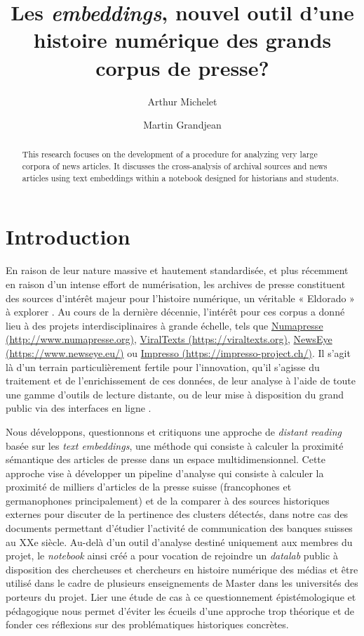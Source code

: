 \documentclass[final, fra]{anthology-ch}     %
\title{Les \textit{embeddings}, nouvel outil d’une histoire numérique des grands corpus de presse?}
\author[1]{Arthur Michelet}[
  orcid=0009-0006-4593-6402,
  email=arthur.michelet@unil.ch
]
\author[1]{Martin Grandjean}[
  orcid=0000-0003-3184-3943,
  email=martin.grandjean@unil.ch
]
\affiliation{1}{Université de Lausanne}
\begin{document}
\maketitle

\begin{abstract}
This research focuses on the development of a procedure for analyzing very large corpora of news articles. It discusses the cross-analysis of archival sources and news articles using text embeddings within a notebook designed for historians and students.
\end{abstract}

\section{Introduction} 
En raison de leur nature massive et hautement standardisée, et plus récemment en raison d'un intense effort de numérisation, les archives de presse constituent des sources d'intérêt majeur pour l'histoire numérique, un véritable « Eldorado » à explorer \cite{Bunout2023b}. Au cours de la dernière décennie, l'intérêt pour ces corpus a donné lieu à des projets interdisciplinaires à grande échelle, tels que \href{http://www.numapresse.org}{Numapresse (http://www.numapresse.org)}, \href{https://viraltexts.org}{ViralTexts (https://viraltexts.org)}, \href{https://www.newseye.eu/}{NewsEye (https://www.newseye.eu/)} ou \href{https://impresso-project.ch/}{Impresso (https://impresso-project.ch/)}. Il s'agit là d'un terrain particulièrement fertile pour l'innovation, qu'il s'agisse du traitement et de l'enrichissement de ces données, de leur analyse à l'aide de toute une gamme d'outils de lecture distante, ou de leur mise à disposition du grand public via des interfaces en ligne \cite{Ehrmann2023e}.

Nous développons, questionnons et critiquons une approche de \textit{distant reading} \cite{Underwood2017} basée sur les \textit{text embeddings}, une méthode qui consiste à calculer la proximité sémantique des articles de presse dans un espace multidimensionnel. Cette approche vise à développer un pipeline d’analyse qui consiste à calculer la proximité de milliers d’articles de la presse suisse (francophones et germanophones principalement) et de la comparer à des sources historiques externes pour discuter de la pertinence des clusters détectés, dans notre cas des documents permettant d’étudier l’activité de communication des banques suisses au XXe siècle. Au-delà d’un outil d’analyse destiné uniquement aux membres du projet, le \textit{notebook} ainsi créé \cite{Michelet2026b} a pour vocation de rejoindre un \textit{datalab} public à disposition des chercheuses et chercheurs en histoire numérique des médias et être utilisé dans le cadre de plusieurs enseignements de Master dans les universités des porteurs du projet. Lier une étude de cas à ce questionnement épistémologique et pédagogique nous permet d’éviter les écueils d’une approche trop théorique et de fonder ces réflexions sur des problématiques historiques concrètes.
\end{document}
